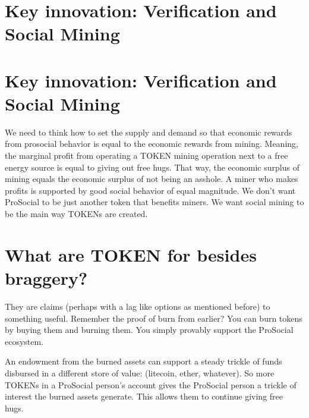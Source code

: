 \section*{Key innovation: Verification and Social Mining}

\section*{Key innovation: Verification and Social Mining}

We need to think how to set the supply and demand so that economic rewards from prosocial behavior is equal to the economic rewards from mining. Meaning, the marginal profit from operating a TOKEN mining operation next to a free energy source is equal to giving out free hugs. That way, the economic surplus of mining equals the economic surplus of not being an asshole. A miner who makes profits is supported by good social behavior of equal magnitude. We don't want ProSocial to be just another token that benefits miners. We want social mining to be the main way TOKENs are created.

\section*{What are TOKEN for besides braggery?}
They are claims (perhaps with a lag like options as mentioned before) to something useful. Remember the proof of burn from earlier? You can burn tokens by buying them and burning them. You simply provably support the ProSocial ecosystem. 

An endowment from the burned assets can support a steady trickle of funds disbursed in a different store of value: (litecoin, ether, whatever). So more TOKENs in a ProSocial person's account gives the ProSocial person a trickle of interest the burned assets generate. This allows them to continue giving free hugs.


\newpage
